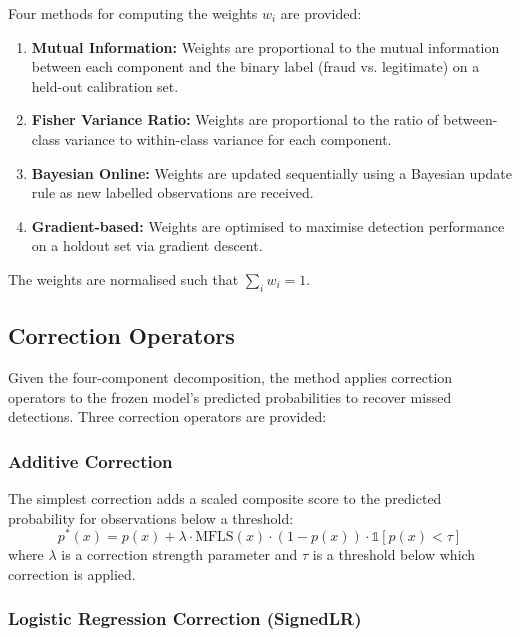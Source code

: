 \documentclass[12pt,a4paper]{article}
\begin{document}
Four methods for computing the weights $w_i$ are provided:

\begin{enumerate}[label=(\alph*)]
\item \textbf{Mutual Information:} Weights are proportional to the mutual 
information between each component and the binary label (fraud vs. 
legitimate) on a held-out calibration set.

\item \textbf{Fisher Variance Ratio:} Weights are proportional to the 
ratio of between-class variance to within-class variance for each component.

\item \textbf{Bayesian Online:} Weights are updated sequentially using a 
Bayesian update rule as new labelled observations are received.

\item \textbf{Gradient-based:} Weights are optimised to maximise detection 
performance on a holdout set via gradient descent.
\end{enumerate}

The weights are normalised such that $\sum_i w_i = 1$.

\subsection{Correction Operators}

Given the four-component decomposition, the method applies correction 
operators to the frozen model's predicted probabilities to recover missed 
detections. Three correction operators are provided:

\subsubsection{Additive Correction}

The simplest correction adds a scaled composite score to the predicted 
probability for observations below a threshold:
\begin{equation}
p^*(x) = p(x) + \lambda \cdot \text{MFLS}(x) \cdot (1 - p(x)) \cdot 
\mathbb{1}[p(x) < \tau]
\end{equation}
where $\lambda$ is a correction strength parameter and $\tau$ is a threshold 
below which correction is applied.

\subsubsection{Logistic Regression Correction (SignedLR)}
\end{document}
